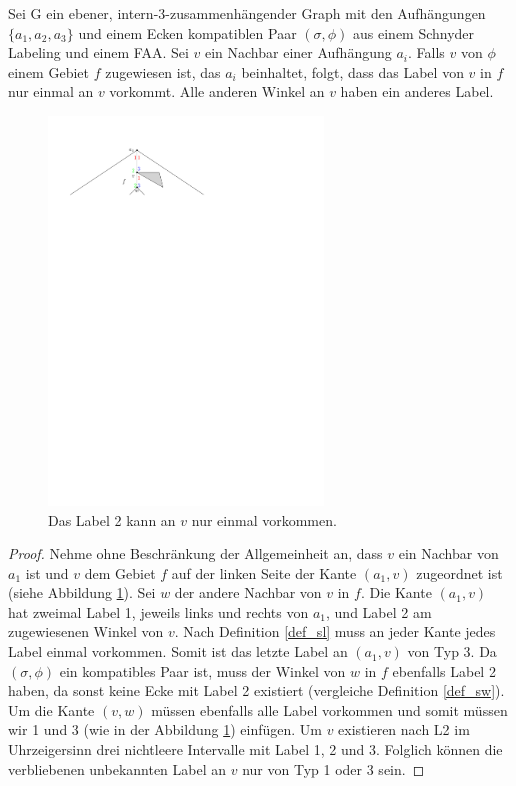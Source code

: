 \begin{lemma}\label{lem4}
Sei G ein ebener, intern-3-zusammenhängender Graph mit den Aufhängungen $\{a_1,a_2,a_3\}$ und einem Ecken kompatiblen Paar $(\sigma,\phi)$ aus einem Schnyder Labeling und einem FAA. Sei $v$ ein Nachbar einer Aufhängung $a_i$. Falls $v$ von $\phi$ einem Gebiet $f$ zugewiesen ist, das $a_i$ beinhaltet, folgt, dass das Label von $v$ in $f$ nur einmal an $v$ vorkommt. Alle anderen Winkel an $v$ haben ein anderes Label.
\end{lemma}

\begin{figure}[h]
\centering
\includegraphics[width=0.65\textwidth]{lem4.pdf}
\caption{Das Label 2 kann an $v$ nur einmal vorkommen.}
\label{lem4}
\centering
\end{figure}

\begin{proof}
Nehme ohne Beschränkung der Allgemeinheit an, dass $v$ ein Nachbar von $a_1$ ist und $v$ dem Gebiet $f$ auf der linken Seite der Kante $(a_1,v)$ zugeordnet ist (siehe Abbildung \ref{lem4}). Sei $w$ der andere Nachbar von $v$ in $f$. Die Kante $(a_1,v)$ hat zweimal Label 1, jeweils links und rechts von $a_1$, und Label 2 am zugewiesenen Winkel von $v$. Nach Definition \ref{def_sl} muss an jeder Kante jedes Label einmal vorkommen. Somit ist das letzte Label an $(a_1,v)$ von Typ 3. Da $(\sigma,\phi)$ ein kompatibles Paar ist, muss der Winkel von $w$ in $f$ ebenfalls Label 2 haben, da sonst keine Ecke mit Label 2 existiert (vergleiche Definition \ref{def_sw}). Um die Kante $(v,w)$ müssen ebenfalls alle Label vorkommen und somit müssen wir 1 und 3 (wie in der Abbildung \ref{lem4}) einfügen. Um $v$ existieren nach L2 im Uhrzeigersinn drei nichtleere Intervalle mit Label 1, 2 und 3. Folglich können die verbliebenen unbekannten Label an $v$ nur von Typ 1 oder 3 sein.
\end{proof}

